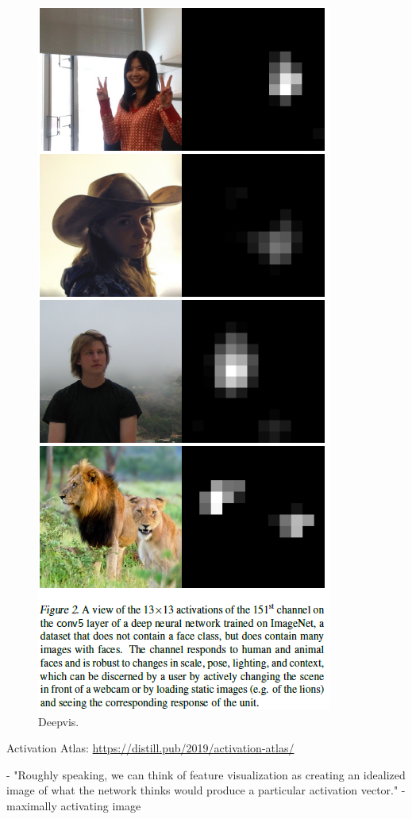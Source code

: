 \documentclass[english]{article}
\begin{document}
\begin{figure}
  \centering
  \includegraphics[scale=0.7]{deepvis.png}
    \caption{Deepvis.}
    \label{Deepvis}
\end{figure}
\item 
Activation Atlas: \url{https://distill.pub/2019/activation-atlas/}

- "Roughly speaking, we can think of feature visualization as creating an idealized image of what the network thinks would produce a particular activation vector." - maximally activating image
\end{document}
